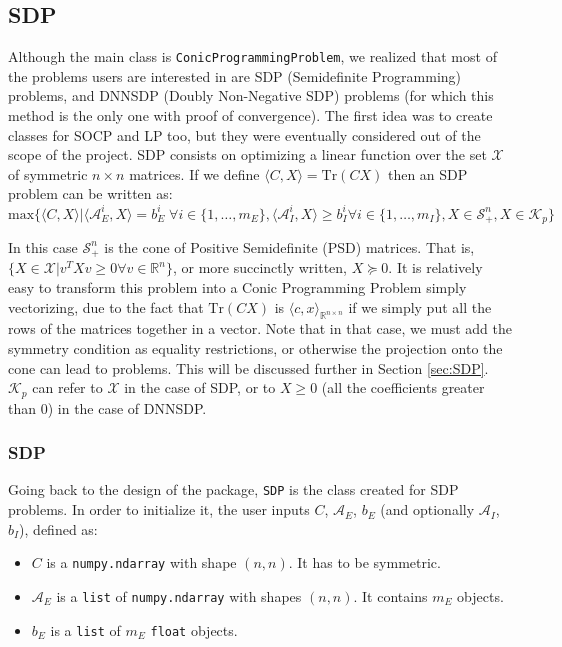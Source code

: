 \documentclass[paper=a4, fontsize=11pt]{scrartcl}
\numberwithin{equation}{section}		%
\numberwithin{figure}{section}			%
\numberwithin{table}{section}				%
\begin{document}
\subsection{SDP}

Although the main class is \texttt{ConicProgrammingProblem}, we realized that most of the problems users are interested in are SDP (Semidefinite Programming) problems, and DNNSDP (Doubly Non-Negative SDP) problems (for which this method is the only one with proof of convergence). The first idea was to create classes for SOCP and LP too, but they were eventually considered out of the scope of the project. SDP consists on optimizing a linear function over the set $\mathcal{X}$ of symmetric $n\times n$ matrices. If we define $\langle C, X \rangle = \text{Tr}(CX)$ then an SDP problem can be written as:
\begin{equation}
\text{max}\{\langle C, X\rangle | \langle\mathcal{A}^i_E, X\rangle = b_E^i \; \forall i \in \{1,\dots,m_{E}\}, \langle\mathcal{A}^i_I,X\rangle\geq b_I^i \forall i \in \{1,\dots,m_I\}, X \in \mathcal{S}^n_+, X \in \mathcal{K}_p\}  
\end{equation}

In this case $\mathcal{S}^n_+$ is the cone of Positive Semidefinite (PSD) matrices. That is, $\{X\in\mathcal{X} | v^T X v \geq 0 \forall v \in \mathbb{R}^n\}$, or more succinctly written, $X\succeq 0$. It is relatively easy to transform this problem into a Conic Programming Problem simply vectorizing, due to the fact that $\text{Tr}(CX)$ is $\langle c, x \rangle _{\mathbb{R}^{n\times n}}$ if we simply put all the rows of the matrices together in a vector. Note that in that case, we must add the symmetry condition as equality restrictions, or otherwise the projection onto the cone can lead to problems. This will be discussed further in Section \ref{sec:SDP}. $\mathcal{K}_p$ can refer to $\mathcal{X}$ in the case of SDP, or to $X\geq 0$ (all the coefficients greater than $0$) in the case of DNNSDP. 
\subsubsection{SDP}
Going back to the design of the package, \texttt{SDP} is the class created for SDP problems. In order to initialize it, the user inputs $C$, $\mathcal{A}_E$, $b_E$ (and optionally $\mathcal{A}_I$, $b_I$), defined as:
\begin{itemize}
\item $C$ is a \texttt{numpy.ndarray} with shape $(n,n)$. It has to be symmetric.
\item $\mathcal{A}_E$ is a \texttt{list} of \texttt{numpy.ndarray} with shapes $(n,n)$. It contains $m_E$ objects.
\item $b_E$ is a \texttt{list} of $m_E$ \texttt{float} objects.
\end{itemize}
\end{document}
